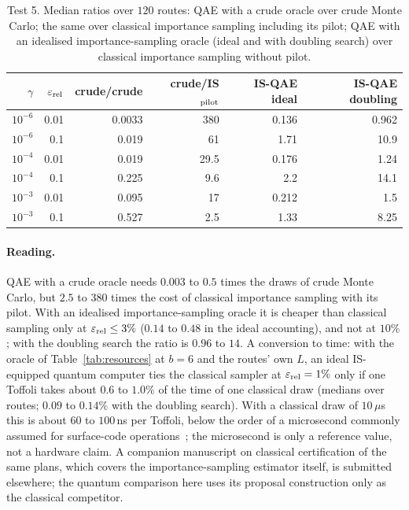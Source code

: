 \documentclass[pdflatex,sn-mathphys-num]{sn-jnl}
\theoremstyle{thmstyleone}
\theoremstyle{thmstyletwo}
\begin{document}
\begin{table}[t]
\caption{Test 5. Median ratios over $120$ routes: QAE with a crude oracle over crude Monte Carlo; the same over classical importance sampling including its pilot; QAE with an idealised importance-sampling oracle (ideal and with doubling search) over classical importance sampling without pilot.}\label{tab:rare}
\begin{tabular}{@{}rrrrrr@{}}
\toprule
$\gamma$ & $\varepsilon_{\rm rel}$ & crude/crude & crude/IS$_{\rm pilot}$ & IS-QAE ideal & IS-QAE doubling \\
\midrule
$10^{-6}$ & 0.01 & 0.0033 & 380 & 0.136 & 0.962 \\
$10^{-6}$ & 0.1 & 0.019 & 61 & 1.71 & 10.9 \\
$10^{-4}$ & 0.01 & 0.019 & 29.5 & 0.176 & 1.24 \\
$10^{-4}$ & 0.1 & 0.225 & 9.6 & 2.2 & 14.1 \\
$10^{-3}$ & 0.01 & 0.095 & 17 & 0.212 & 1.5 \\
$10^{-3}$ & 0.1 & 0.527 & 2.5 & 1.33 & 8.25 \\
\bottomrule
\end{tabular}
\end{table}

\paragraph{Reading.} QAE with a crude oracle needs $0.003$ to $0.5$ times the draws of crude Monte Carlo, but $2.5$ to $380$ times the cost of classical importance sampling with its pilot. With an idealised importance-sampling oracle it is cheaper than classical sampling only at $\varepsilon_{\rm rel}\le3\%$ ($0.14$ to $0.48$ in the ideal accounting), and not at $10\%$; with the doubling search the ratio is $0.96$ to $14$. A conversion to time: with the oracle of Table~\ref{tab:resources} at $b=6$ and the routes' own $L$, an ideal IS-equipped quantum computer ties the classical sampler at $\varepsilon_{\rm rel}=1\%$ only if one Toffoli takes about $0.6$ to $1.0\%$ of the time of one classical draw (medians over routes; $0.09$ to $0.14\%$ with the doubling search). With a classical draw of $10\,\mu$s this is about $60$ to $100$\,ns per Toffoli, below the order of a microsecond commonly assumed for surface-code operations~\cite{gidney2021rsa}; the microsecond is only a reference value, not a hardware claim. A companion manuscript on classical certification of the same plans, which covers the importance-sampling estimator itself, is submitted elsewhere; the quantum comparison here uses its proposal construction only as the classical competitor.
\end{document}
